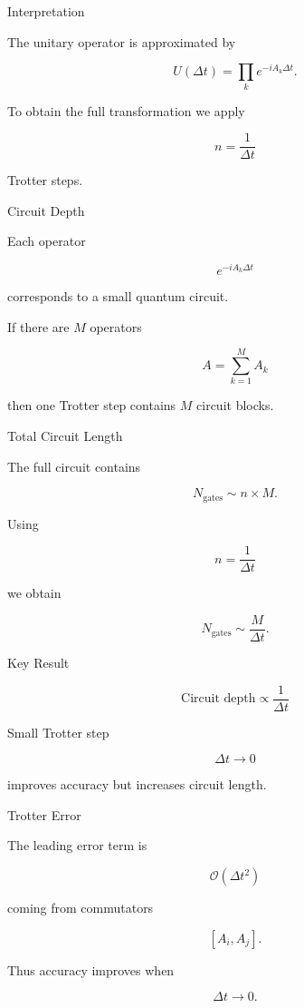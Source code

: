 \documentclass{beamer}
\begin{document}
\begin{frame}{Interpretation}

The unitary operator is approximated by

\[
U(\Delta t) =
\prod_k e^{-i A_k \Delta t}.
\]

To obtain the full transformation we apply

\[
n = \frac{1}{\Delta t}
\]

Trotter steps.

\end{frame}

\begin{frame}{Circuit Depth}

Each operator

\[
e^{-iA_k\Delta t}
\]

corresponds to a small quantum circuit.

If there are $M$ operators

\[
A = \sum_{k=1}^M A_k
\]

then one Trotter step contains $M$ circuit blocks.

\end{frame}

\begin{frame}{Total Circuit Length}

The full circuit contains

\[
N_{\text{gates}}
\sim
n \times M .
\]

Using

\[
n = \frac{1}{\Delta t}
\]

we obtain

\[
N_{\text{gates}} \sim \frac{M}{\Delta t}.
\]

\end{frame}

\begin{frame}{Key Result}

\[
\boxed{
\text{Circuit depth} \propto \frac{1}{\Delta t}
}
\]

Small Trotter step

\[
\Delta t \rightarrow 0
\]

improves accuracy but increases circuit length.

\end{frame}

\begin{frame}{Trotter Error}

The leading error term is

\[
\mathcal{O}(\Delta t^2)
\]

coming from commutators

\[
[A_i , A_j].
\]

Thus accuracy improves when

\[
\Delta t \rightarrow 0.
\]

\end{frame}
\end{document}
